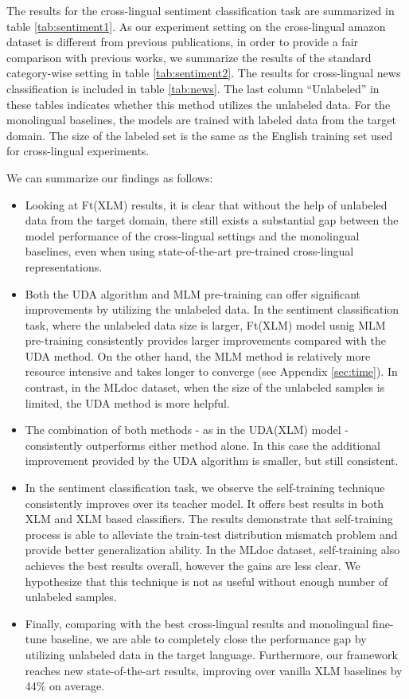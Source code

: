\documentclass{article} \usepackage{iclr2020_conference,times}
\begin{document}
The results for the cross-lingual sentiment classification task are summarized in table \ref{tab:sentiment1}. 
As our experiment setting on the cross-lingual amazon dataset is different from previous publications,
in order to provide a fair comparison with previous works, we summarize the results of the standard category-wise setting in table \ref{tab:sentiment2}. 
The results for cross-lingual news classification is included in table \ref{tab:news}. The last column ``Unlabeled'' in these tables indicates whether this method utilizes the unlabeled data. 
For the monolingual baselines, the models are trained with labeled data from the target domain. The size of the labeled set is the same as the English training set used for cross-lingual experiments. 

We can summarize our findings as follows: 
\begin{itemize}[leftmargin=*]
\item Looking at Ft(XLM) results, it is clear that without the help of unlabeled data from the target domain, there still exists a substantial gap between the model performance of the cross-lingual settings and the monolingual baselines, even when using state-of-the-art pre-trained cross-lingual representations.  
\item  Both the UDA algorithm and MLM pre-training can offer significant improvements by utilizing the unlabeled data. 
In the sentiment classification task, where the unlabeled data size is larger, Ft(XLM) model usnig MLM pre-training consistently provides larger improvements compared with the UDA method. 
On the other hand, the MLM method is relatively more resource intensive and takes longer to converge (see Appendix \ref{sec:time}). In contrast, in the MLdoc dataset, when the size of the unlabeled samples is limited, the UDA method is more helpful. 
\item The combination of both methods - as in the UDA(XLM) model - consistently outperforms either method alone. In this case the additional improvement provided by the UDA algorithm is smaller, but still consistent.
\item In the sentiment classification task, we observe the self-training technique consistently improves over its teacher model. 
It offers best results in both XLM and XLM based classifiers. 
The results demonstrate that self-training process is able to alleviate the train-test distribution mismatch problem and provide better generalization ability.
In the MLdoc dataset, self-training also achieves the best results overall, however the gains are less clear.  We hypothesize that this technique is not as useful without enough number of unlabeled samples. 
\item Finally, comparing with the best cross-lingual results and monolingual fine-tune baseline, we are able to completely close the performance gap by utilizing unlabeled data in the target language. 
Furthermore, our framework reaches new state-of-the-art results, improving over vanilla XLM baselines by 44\% on average. 
\end{itemize}
\end{document}
